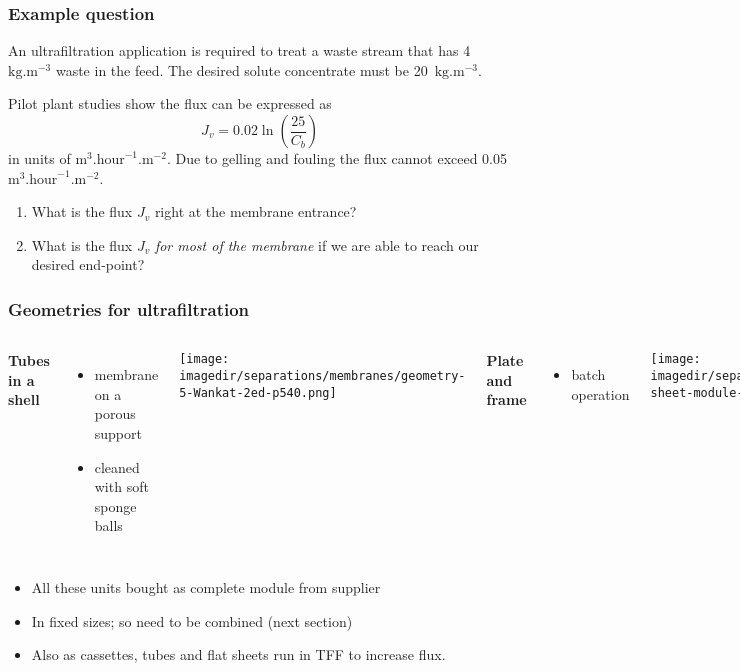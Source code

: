 \begin{frame}\frametitle{Example question}
	An ultrafiltration application is required to treat a waste stream that has 4~$\text{kg}\text{.m}^{-3}$ waste in the feed. The desired solute concentrate must be 20~$\text{kg}\text{.m}^{-3}$.

	\vspace{12pt}
	Pilot plant studies show the flux can be expressed as
	\[
		J_v = 0.02 \ln \left(\frac{25}{C_b} \right)
	\]
	in units of $\text{m}^3.\text{hour}^{-1}.\text{m}^{-2}$. Due to gelling and fouling the flux cannot exceed 0.05 $\text{m}^3.\text{hour}^{-1}.\text{m}^{-2}$.

	\vspace{12pt}
	\begin{enumerate}
		\item	What is the flux $J_v$ right at the membrane entrance?
		\item	What is the flux $J_v$ \emph{{\color{myOrange}for most of the membrane}} if we are able to reach our desired end-point?
	\end{enumerate}
\end{frame}

\begin{frame}\frametitle{Geometries for ultrafiltration}
	\begin{columns}[t]
			\textbf{Tubes in a shell}
				\begin{itemize}
					\item	membrane on a porous support
					\item	cleaned with soft sponge balls
				\end{itemize}
			\begin{center}
				\texttt{[image: \\imagedir/separations/membranes/geometry-5-Wankat-2ed-p540.png]}
			\end{center}
			\textbf{Plate and frame}
				\begin{itemize}
					\item	batch operation
				\end{itemize}
				\begin{center}
					\texttt{[image: \\imagedir/separations/membranes/flat-sheet-module-CRv2-5ed-p456.png]}
				\end{center}
	\end{columns}
	\begin{itemize}
		\item	All these units bought as complete module from supplier
		\item	In fixed sizes; so need to be combined (next section)
		\item	Also as cassettes, tubes and flat sheets run in TFF to increase flux. %
	\end{itemize}
\end{frame}

